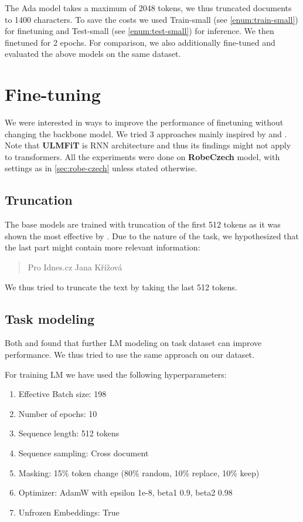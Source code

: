 The Ada model takes a maximum of 2048 tokens, we thus truncated documents to 1400 characters.
To save the costs we used Train-small (see \autoref{enum:train-small}) for finetuning and
Test-small (see \autoref{enum:test-small}) for inference.
We then finetuned for 2 epochs.
For comparison, we also additionally fine-tuned and evaluated the above models on the same dataset.

\section{Fine-tuning}
\label{sec:finetuning}
We were interested in ways to improve the performance of finetuning without changing the backbone model.
We tried 3 approaches mainly inspired by \cite{howardUniversalLanguageModel2018a} and \cite{sunHowFineTuneBERT2020}.
Note that \textbf{ULMFiT} is RNN architecture and thus its findings might not apply to transformers.
All the experiments were done on \textbf{RobeCzech} model, with settings as in \autoref{sec:robe-czech}
unless stated otherwise.

\subsection{Truncation}
\label{sec:truncation}
The base models are trained with truncation of the first 512 tokens as it was shown
the most effective by \cite{sunHowFineTuneBERT2020}. Due to the nature of the task,
we hypothesized that the last part might contain more relevant information:
\begin{quotation}
    Pro Idnes.cz Jana Křížová
\end{quotation}
We thus tried to truncate the text by taking the last
512 tokens.

\subsection{Task modeling}
\label{sec:task-modeling}
Both \cite{howardUniversalLanguageModel2018a} and \cite{sunHowFineTuneBERT2020}
found that further LM modeling on task dataset can improve performance.
We thus tried to use the same approach on our dataset.

For training LM we have used the following hyperparameters:
\begin{enumerate}
    \item Effective Batch size: 198
    \item Number of epochs: 10
    \item Sequence length: 512 tokens
    \item Sequence sampling: Cross document
    \item Masking: 15\% token change (80\% random, 10\% replace, 10\% keep)
    \item Optimizer: AdamW with epsilon 1e-8, beta1 0.9, beta2 0.98
    \item Unfrozen Embeddings: True
\end{enumerate}




